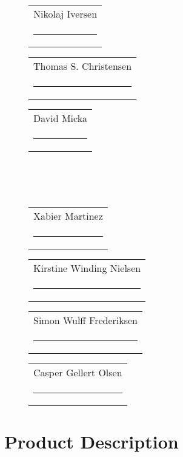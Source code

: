 



\setlength{\parindent}{0pt}
\setlength{\parskip}{0.7\baselineskip}%
\thispagestyle{empty}

\clearpage

\fancyfoot{}
\fancyfoot[CO,CE]{\thepage}


% 


\pagestyle{fancy}
\fancyfoot{}
\setcounter{page}{1}
\fancyfoot[LO,RE]{\thepage}



\begin{figure}
\newcommand{\namesigdate}[2][5cm]{%
  \begin{tabular}{@{}p{#1}@{}}
    #2 \\[2\normalbaselineskip] \hrule \\[0pt]
  \end{tabular}
}
\begin{changemargin}{-0cm}{-0cm}
\centering
\noindent \namesigdate[4.3cm]{Nikolaj Iversen} \hspace{1cm} \namesigdate[4.3cm]{Thomas S. Christensen} \hspace{1cm} \namesigdate[4.3cm]{David Micka} \\~\\~\\
\centering
\noindent \namesigdate[4.3cm]{Xabier Martinez} \hspace{1cm}  \namesigdate[4.3cm]{Kirstine Winding Nielsen} \hspace{1cm}   \namesigdate[4.3cm]{Simon Wulff Frederiksen}
\hfill \namesigdate[4.3cm]{Casper Gellert Olsen} \hfill 
\end{changemargin}
\end{figure}

\clearpage






\section{Product Description}\label{product_description}



\clearpage

